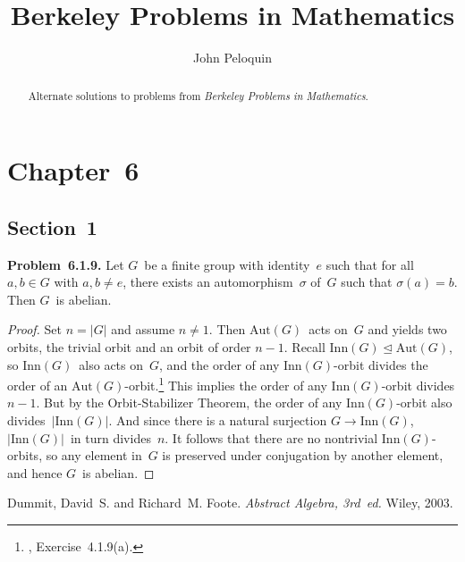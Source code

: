 \documentclass[letterpaper]{article}
\title{Berkeley Problems in Mathematics}
\author{John Peloquin}
\date{}
\newcommand{\problem}[1]{\goodbreak\noindent\textbf{Problem~{#1}.}}
\newcommand{\normal}{\trianglelefteq}
\newcommand{\aut}{\mathrm{Aut}}
\newcommand{\inn}{\mathrm{Inn}}
\newcommand{\ord}[1]{|{#1}|}
\begin{document}
\maketitle
\begin{abstract}
Alternate solutions to problems from \emph{Berkeley Problems in Mathematics}.
\end{abstract}

\section*{Chapter~6}
\subsection*{Section~1}
\problem{6.1.9}
Let $G$~be a finite group with identity~$e$ such that for all $a,b\in G$ with $a,b\ne e$, there exists an automorphism~$\sigma$ of~$G$ such that $\sigma(a)=b$. Then $G$~is abelian.
\begin{proof}
Set $n=\ord{G}$ and assume $n\ne1$. Then $\aut(G)$~acts on~$G$ and yields two orbits, the trivial orbit and an orbit of order $n-1$. Recall $\inn(G)\normal\aut(G)$, so $\inn(G)$~also acts on~$G$, and the order of any $\inn(G)$-orbit divides the order of an $\aut(G)$-orbit.\footnote{\cite{dummit03}, Exercise~4.1.9(a).} This implies the order of any $\inn(G)$-orbit divides $n-1$. But by the Orbit-Stabilizer Theorem, the order of any $\inn(G)$-orbit also divides~$\ord{\inn(G)}$. And since there is a natural surjection $G\to\inn(G)$, $\ord{\inn(G)}$~in turn divides~$n$. It follows that there are no nontrivial $\inn(G)$-orbits, so any element in~$G$ is preserved under conjugation by another element, and hence $G$~is abelian.
\end{proof}

\begin{thebibliography}{0}
 Dummit, David~S. and Richard~M. Foote. \emph{Abstract Algebra, 3rd~ed.} Wiley, 2003.
\end{thebibliography}
\end{document}
